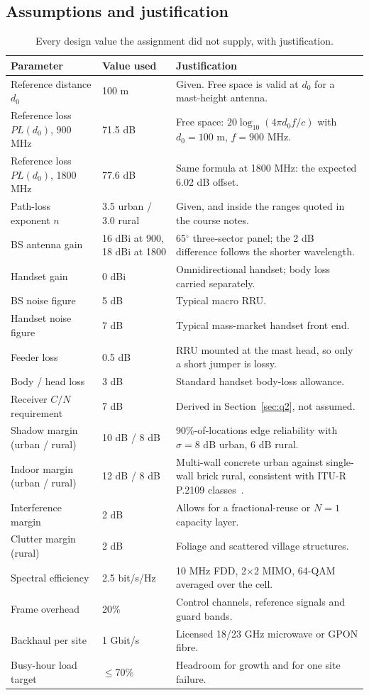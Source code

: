 \documentclass[9pt,a4paper]{article}
\begin{document}
\subsection{Assumptions and justification}
\begin{table}[H]\centering\small
\caption{Every design value the assignment did not supply, with justification.}
\label{tab:assume}
\begin{tabularx}{\textwidth}{@{}p{3.5cm}p{1.9cm}X@{}}
\toprule
\textbf{Parameter} & \textbf{Value used} & \textbf{Justification} \\
\midrule
Reference distance $d_0$ & 100 m & Given. Free space is valid at $d_0$ for a mast-height antenna. \\
Reference loss $PL(d_0)$, 900 MHz & 71.5 dB & Free space: $20\log_{10}(4\pi d_0 f/c)$ with $d_0=100$ m, $f=900$ MHz. \\
Reference loss $PL(d_0)$, 1800 MHz & 77.6 dB & Same formula at 1800 MHz: the expected 6.02 dB offset. \\
Path-loss exponent $n$ & 3.5 urban / 3.0 rural & Given, and inside the ranges quoted in the course notes. \\
BS antenna gain & 16 dBi at 900, 18 dBi at 1800 & 65$^\circ$ three-sector panel; the 2 dB difference follows the shorter wavelength. \\
Handset gain & 0 dBi & Omnidirectional handset; body loss carried separately. \\
BS noise figure & 5 dB & Typical macro RRU. \\
Handset noise figure & 7 dB & Typical mass-market handset front end. \\
Feeder loss & 0.5 dB & RRU mounted at the mast head, so only a short jumper is lossy. \\
Body / head loss & 3 dB & Standard handset body-loss allowance. \\
Receiver $C/N$ requirement & 7 dB & Derived in Section~\ref{sec:q2}, not assumed. \\
Shadow margin (urban / rural) & 10 dB / 8 dB & 90\%-of-locations edge reliability with $\sigma=8$ dB urban, 6 dB rural. \\
Indoor margin (urban / rural) & 12 dB / 8 dB & Multi-wall concrete urban against single-wall brick rural, consistent with ITU-R P.2109 classes~\cite{p2109}. \\
Interference margin & 2 dB & Allows for a fractional-reuse or $N=1$ capacity layer. \\
Clutter margin (rural) & 2 dB & Foliage and scattered village structures. \\
Spectral efficiency & 2.5 bit/s/Hz & 10 MHz FDD, 2$\times$2 MIMO, 64-QAM averaged over the cell. \\
Frame overhead & 20\% & Control channels, reference signals and guard bands. \\
Backhaul per site & 1 Gbit/s & Licensed 18/23 GHz microwave or GPON fibre. \\
Busy-hour load target & $\leq$70\% & Headroom for growth and for one site failure. \\
\bottomrule
\end{tabularx}
\end{table}
\end{document}
